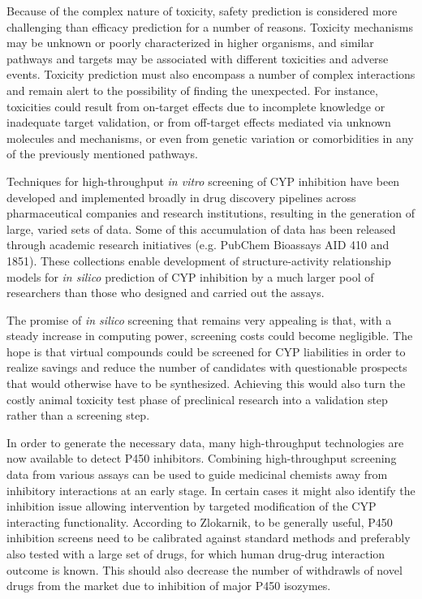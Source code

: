 Because of the complex nature of toxicity, safety prediction is considered more challenging than efficacy prediction for a number of reasons. \cite{Kruhlak2012} Toxicity mechanisms may be unknown or poorly characterized in higher organisms, and similar pathways and targets may be associated with different toxicities and adverse events. Toxicity prediction must also encompass a number of complex interactions and remain alert to the possibility of finding the unexpected. For instance, toxicities could result from on-target effects due to incomplete knowledge or inadequate target validation, or from off-target effects mediated via unknown molecules and mechanisms, or even from genetic variation or comorbidities in any of the previously mentioned pathways.

Techniques for high-throughput \textit{in vitro} screening of CYP inhibition have been developed and implemented broadly in drug discovery pipelines across pharmaceutical companies and research institutions, resulting in the generation of large, varied sets of data. Some of this accumulation of data has been released through academic research initiatives (e.g. PubChem Bioassays AID 410 and 1851). These collections enable development of structure-activity relationship models for \textit{in silico} prediction of CYP inhibition by a much larger pool of researchers than those who designed and carried out the assays.

The promise of \textit{in silico} screening that remains very appealing is that, with a steady increase in computing power, screening costs could become negligible. The hope is that virtual compounds could be screened for CYP liabilities in order to realize savings and reduce the number of candidates with questionable prospects that would otherwise have to be synthesized. \cite{Zlokarnik2005} Achieving this would also turn the costly animal toxicity test phase of preclinical research into a validation step rather than a screening step.

In order to generate the necessary data, many high-throughput technologies are now available to detect P450 inhibitors. Combining high-throughput screening data from various assays can be used to guide medicinal chemists away from inhibitory interactions at an early stage. In certain cases it might also identify the inhibition issue allowing intervention by targeted modification of the CYP interacting functionality. According to Zlokarnik, to be generally useful, P450 inhibition screens need to be calibrated against standard methods and preferably also tested with a large set of drugs, for which human drug-drug interaction outcome is known. \cite{Zlokarnik2005} This should also decrease the number of withdrawls of novel drugs from the market due to inhibition of major P450 isozymes.

